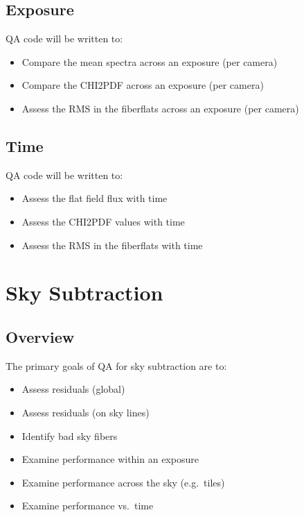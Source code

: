 \documentclass[12pt]{article}
\newenvironment{myitemize}
{ \begin{itemize}
    \setlength{\itemsep}{0pt}
    \setlength{\parskip}{0pt}
    \setlength{\parsep}{0pt}     }
{ \end{itemize}                  }
\begin{document}
\subsection{Exposure}

QA code will be written to:

\begin{myitemize}
\item Compare the mean spectra across an exposure (per camera)
\item Compare the CHI2PDF across an exposure (per camera)
\item Assess the RMS in the fiberflats across an exposure (per camera)
\end{myitemize}

\subsection{Time}

QA code will be written to:

\begin{myitemize}
\item Assess the flat field flux with time
\item Assess the CHI2PDF values with time
\item Assess the RMS in the fiberflats with time
\end{myitemize}

\section{Sky Subtraction}

\subsection{Overview}

The primary goals of QA for sky subtraction are to:

\begin{myitemize}
\item Assess residuals (global)
\item Assess residuals (on sky lines)
\item Identify bad sky fibers
\item Examine performance within an exposure
\item Examine performance across the sky (e.g.\ tiles)
\item Examine performance vs.\ time
\end{myitemize}
\end{document}
